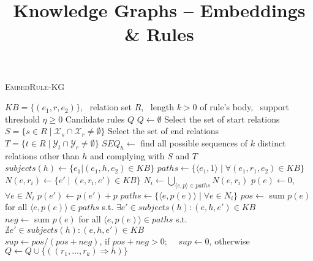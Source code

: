 \documentclass[a4paper,9pt]{article}
\begin{document}
\title{Knowledge Graphs -- Embeddings \& Rules}


\author{\vspace{10mm}}

\maketitle 



\begin{algorithm}[h!]
\caption{\textsc{EmbedRule-KG}}
\label{alg:embedrulekg}
\begin{algorithmic}[1]
\small
\REQUIRE $KB = \{(e_1,r, e_2)\}$, \ relation set $R$, \ length $k > 0$ of rule's body, \ support threshold $\eta \geq 0$
\ENSURE Candidate rules $Q$
\STATE $Q \gets \emptyset$
	\STATE Select the set of start relations $S = \{s \in R \mid \mathcal{X}_s \cap \mathcal{X}_r \neq \emptyset\}$
	\STATE Select the set of end relations $T = \{t \in R \mid \mathcal{Y}_t \cap \mathcal{Y}_r \neq \emptyset\}$
	\STATE $SEQ_h \gets $ find all possible sequences of $k$ distinct relations other than $h$ and complying with $S$ and $T$ 
	\vspace{1mm}
	\\
	\STATE $subjects(h) \gets \{e_1 | (e_1,h,e_2) \in KB\}$
		\STATE $paths \gets \{\langle e_1, 1 \rangle \mid \forall(e_1,r_1,e_2) \in KB \}$
				\STATE $N(e,r_i) \gets \{e' \mid (e,r_i,e') \in KB\}$\hfill{}
			\ENDFOR
			\STATE $N_i \gets \bigcup_{\langle e, p\rangle \in paths} N(e,r_i) $
			\STATE $p(e) \gets 0$, \ $\forall e \in N_i$
				\STATE $p(e') \gets p(e') + p$
			\ENDFOR
			\STATE $paths \gets \{\langle e, p(e) \rangle \mid \forall e \in N_i \}$
		\ENDFOR
		\STATE $pos \gets $ sum $p(e)$ for all $\langle e, p(e) \rangle \in paths$ s.t. $\exists e' \in subjects(h) : (e,h,e') \in KB$
		\\\hfill{}
		\STATE $neg \gets $ sum $p(e)$ for all $\langle e, p(e) \rangle \in paths$ s.t. $\nexists e' \in subjects(h) : (e,h,e') \in KB$
		\\\hfill{}
		\STATE $sup \gets pos/(pos+neg)$, if $pos+neg>0$; \ \  $sup \gets 0$, otherwise
			\STATE $Q \gets Q \cup \{((r_1, \ldots, r_k) \Rightarrow h)\}$
		\ENDIF 
	\ENDFOR
\ENDFOR
\end{algorithmic}
\end{algorithm}
\end{document}
